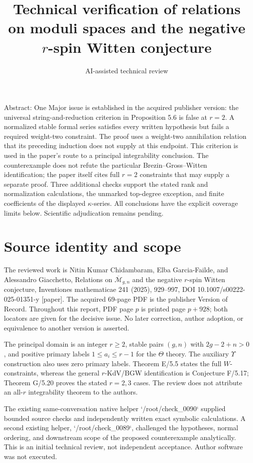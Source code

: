 \documentclass[10pt]{article}
\title{Technical verification of relations on moduli spaces and the negative \(r\)-spin Witten conjecture}
\author{AI-assisted technical review}
\date{}
\begin{document}
\maketitle
Abstract: One Major issue is established in the acquired publisher version: the universal string-and-reduction criterion in Proposition 5.6 is false at \(r=2\). A normalized stable formal series satisfies every written hypothesis but fails a required weight-two constraint. The proof uses a weight-two annihilation relation that its preceding induction does not supply at this endpoint. This criterion is used in the paper’s route to a principal integrability conclusion. The counterexample does not refute the particular Brezin–Gross–Witten identification; the paper itself cites full \(r=2\) constraints that may supply a separate proof. Three additional checks support the stated rank and normalization calculations, the unmarked top-degree exception, and finite coefficients of the displayed \(\kappa\)-series. All conclusions have the explicit coverage limits below. Scientific adjudication remains pending.\par
\section*{Source identity and scope}
The reviewed work is Nitin Kumar Chidambaram, Elba Garcia-Failde, and Alessandro Giacchetto, Relations on \(\overline{\mathcal M}_{g,n}\) and the negative \(r\)-spin Witten conjecture, Inventiones mathematicae 241 (2025), 929–997, DOI 10.1007/s00222-025-01351-y [paper]. The acquired 69-page PDF is the publisher Version of Record. Throughout this report, PDF page \(p\) is printed page \(p+928\); both locators are given for the decisive issue. No later correction, author adoption, or equivalence to another version is asserted.\par
The principal domain is an integer \(r\ge2\), stable pairs \((g,n)\) with \(2g-2+n>0\), and positive primary labels \(1\le a_i\le r-1\) for the \(\Theta\) theory. The auxiliary \(\Upsilon\) construction also uses zero primary labels. Theorem E/5.5 states the full \(W\)-constraints, whereas the general \(r\)-KdV/BGW identification is Conjecture F/5.17; Theorem G/5.20 proves the stated \(r=2,3\) cases. The review does not attribute an all-\(r\) integrability theorem to the authors.\par
The existing same-conversation native helper `/root/check\_0090` supplied bounded source checks and independently written exact symbolic calculations. A second existing helper, `/root/check\_0089`, challenged the hypotheses, normal ordering, and downstream scope of the proposed counterexample analytically. This is an initial technical review, not independent acceptance. Author software was not executed.\par
\end{document}
